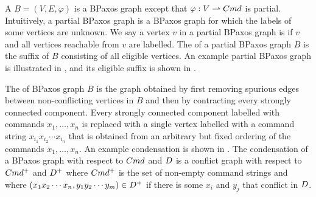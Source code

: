 A  $B = (V, E, \varphi)$ is a BPaxos graph except
that $\varphi: V \rightharpoonup Cmd$ is partial. Intuitively, a partial BPaxos
graph is a BPaxos graph for which the labels of some vertices are unknown.
%
We say a vertex $v$ in a partial BPaxos graph is  if $v$ and
all vertices reachable from $v$ are labelled. The  of
a partial BPaxos graph $B$ is the suffix of $B$ consisting of all eligible
vertices.
%
An example partial BPaxos graph is illustrated in ,
and its eligible suffix is shown in .

The  of BPaxos graph $B$ is the graph obtained by first
removing spurious edges between non-conflicting vertices in $B$ and then by
contracting every strongly connected component. Every strongly connected
component labelled with commands $x_1, \ldots, x_n$ is replaced with a single
vertex labelled with a command string $x_{i_1} x_{i_2} \cdots x_{i_n}$ that is
obtained from an arbitrary but fixed ordering of the commands $x_1, \ldots,
x_n$. An example condensation is shown in .
%
The condensation of a BPaxos graph with respect to $Cmd$ and $D$ is
a conflict graph with respect to $Cmd^+$ and $D^+$ where $Cmd^+$ is
the set of non-empty command strings and where $(x_1 x_2 \cdots x_n, y_1 y_2
\cdots y_m) \in D^+$ if there is some $x_i$ and $y_j$ that conflict in
$D$.

